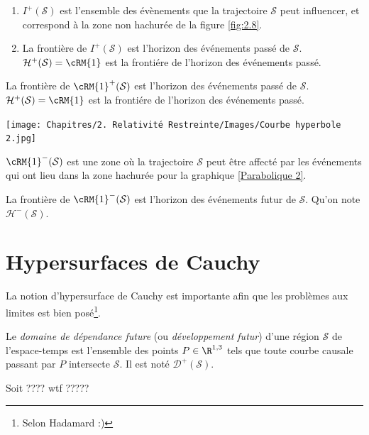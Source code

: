 \begin{exmp}
\begin{enumerate}
    \item $I^{+}(\mathcal{S})$ est l'ensemble des évènements que la trajectoire $\mathcal{S}$ peut influencer, et correspond à la zone non hachurée de la figure \ref{fig:2.8}.

    \item La frontière de $I^{+}(\mathcal{S})$ est l'horizon des événements passé de $\mathcal{S}$. $\mathcal{H}^{+}(\mathcal{S}) = \cRM{1}$ est la frontiére de l'horizon des événements passé. 
\end{enumerate}



La frontière de $\cRM{1}^{+}(\mathcal{S})$ est l'horizon des événements passé de $\mathcal{S}$. $\mathcal{H}^{+}(\mathcal{S}) = \cRM{1}$ est la frontiére de l'horizon des événements passé. 

\begin{center}
\texttt{[image: Chapitres/2. Relativité Restreinte/Images/Courbe hyperbole 2.jpg]}
\label{Parabolique 2}
\end{center}

$\cRM{1}^{-}(\mathcal{S})$ est une zone où la trajectoire $\mathcal{S}$ peut être affecté par les événements qui ont lieu dans la zone hachurée pour la graphique \ref{Parabolique 2}. 

La frontière de $\cRM{1}^{-}(\mathcal{S})$ est l'horizon des événements futur  de $\mathcal{S}$. Qu'on note $\mathcal{H}^{-}(\mathcal{S})$.

\end{exmp}

\section{Hypersurfaces de Cauchy}
La notion d'hypersurface de Cauchy est importante afin que les problèmes aux limites est bien posé\footnote{Selon Hadamard :)}.

\begin{theoremframe}
    \begin{defi}
        Le \textit{domaine de dépendance future} (ou \textit{développement futur}) d'une région $\mathcal{S}$ de l'espace-temps est l'ensemble des points $P \in \R^{1,3}$ tels que toute courbe causale passant par $P$ intersecte $\mathcal{S}$. Il est noté $\mathcal{D}^+(\mathcal{S})$.
    \end{defi}
\end{theoremframe}
\begin{exmp}
    Soit ???? wtf ?????
\end{exmp}










